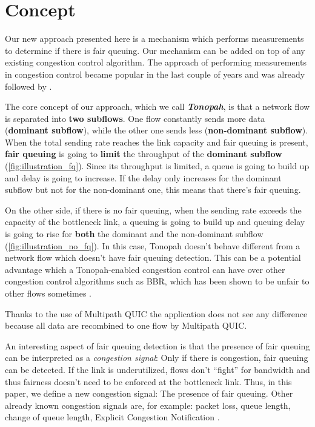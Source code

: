 \documentclass[conference]{IEEEtran}
\begin{document}
\section{Concept}

Our new approach presented here is a mechanism which performs measurements to determine if there is fair queuing. Our mechanism can be added on top of any existing congestion control algorithm. 
The approach of performing measurements in congestion control became popular in the last couple of years and was already followed by \cite{cardwell_bbr_2016,dong_pcc_2015,goyal_elasticity_2020,hayes_online_2020}.

The core concept of our approach, which we call \textbf{\textit{Tonopah}}, is that a network flow is separated into \textbf{two subflows}. 
One flow constantly sends more data (\textbf{dominant subflow}), while the other one sends less (\textbf{non-dominant subflow}). 
When the total sending rate reaches the link capacity and fair queuing is present, 
\textbf{fair queuing} is going to \textbf{limit} the throughput of the \textbf{dominant subflow} (\autoref{fig:illustration_fq}). 
Since its throughput is limited, a queue is going to build up and delay is going to increase. If the delay only increases for the dominant subflow but not for the non-dominant one, this means that there's fair queuing. 

On the other side, if there is no fair queuing, when the sending rate exceeds the capacity of the bottleneck link, a queuing is going to build up and queuing delay is going to rise for \textbf{both} the dominant and the non-dominant subflow (\autoref{fig:illustration_no_fq}). 
In this case, Tonopah doesn't behave different from a network flow which doesn't have fair queuing detection. 
This can be a potential advantage which a Tonopah-enabled congestion control can have over other congestion control algorithms such as BBR, which has been shown to be unfair to other flows sometimes \cite{ware_modeling_2019,hock_experimental_2017}.

Thanks to the use of Multipath QUIC \cite{liu_multipath_2022} the application does not see any difference because all data are recombined to one flow by Multipath QUIC. 

An interesting aspect of fair queuing detection is that the presence of fair queuing can be interpreted as a \textit{congestion signal}: 
Only if there is congestion, fair queuing can be detected. If the link is underutilized, flows don't ``fight'' for bandwidth and thus fairness doesn't need to be enforced at the bottleneck link. 
Thus, in this paper, we define a new congestion signal: The presence of fair queuing. Other already known congestion signals are, for example: 
packet loss, queue length, change of queue length, Explicit Congestion Notification \cite{mathis_relentless_2009,hayes_revisiting_2011}. 
\end{document}
